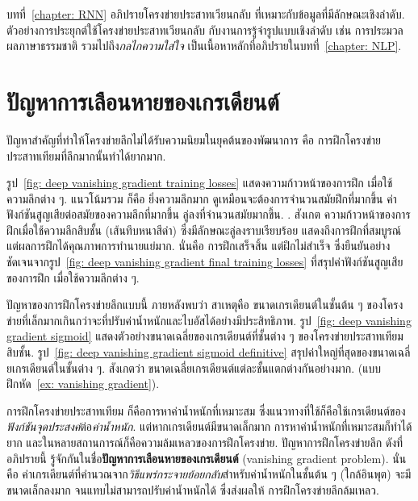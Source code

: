 บทที่~\ref{chapter: RNN} อภิปรายโครงข่ายประสาทเวียนกลับ
ที่เหมาะกับข้อมูลที่มีลักษณะเชิงลำดับ.
ตัวอย่างการประยุกต์ใช้โครงข่ายประสาทเวียนกลับ
กับงานการรู้จำรูปแบบเชิงลำดับ
เช่น การประมวลผลภาษาธรรมชาติ
รวมไปถึง\textit{กลไกความใส่ใจ}
เป็นเนื้อหาหลักที่อภิปรายในบทที่~\ref{chapter: NLP}.

\section{ปัญหาการเลือนหายของเกรเดียนต์}
\label{sec: relu}

ปัญหาสำคัญที่ทำให้โครงข่ายลึกไม่ได้รับความนิยมในยุคต้นของพัฒนาการ
คือ
%
การฝึกโครงข่ายประสาทเทียมที่ลึกมากนั้นทำได้ยากมาก.

รูป~\ref{fig: deep vanishing gradient training losses}
แสดงความก้าวหน้าของการฝึก เมื่อใช้ความลึกต่าง ๆ.
แนวโน้มรวม ก็คือ ยิ่งความลึกมาก ดูเหมือนจะต้องการจำนวนสมัยฝึกที่มากขึ้น
ค่าฟังก์ชันสูญเสียต่อสมัยของความลึกที่มากขึ้น ลู่ลงที่จำนวนสมัยมากขึ้น.
.
สังเกต ความก้าวหน้าของการฝึกเมื่อใช้ความลึกสิบชั้น (เส้นทึบหนาสีดำ) ซึ่งมีลักษณะลู่ลงราบเรียบร้อย แสดงถึงการฝึกที่สมบูรณ์
แต่ผลการฝึกได้คุณภาพการทำนายแย่มาก.
นั่นคือ การฝึกเสร็จสิ้น แต่ฝึกไม่สำเร็จ 
ซึ่งยืนยันอย่างชัดเจนจากรูป~\ref{fig: deep vanishing gradient final training losses}
ที่สรุปค่าฟังก์ชันสูญเสียของการฝึก เมื่อใช้ความลึกต่าง ๆ.

ปัญหาของการฝึกโครงข่ายลึกแบบนี้ ภายหลังพบว่า
สาเหตุคือ ขนาดเกรเดียนต์ในชั้นต้น ๆ ของโครงข่ายที่เล็กมากเกินกว่าจะที่ปรับค่าน้ำหนักและไบอัสได้อย่างมีประสิทธิภาพ.
รูป~\ref{fig: deep vanishing gradient sigmoid} แสดงตัวอย่างขนาดเฉลี่ยของเกรเดียนต์ที่ชั้นต่าง ๆ
ของโครงข่ายประสาทเทียมสิบชั้น.
รูป~\ref{fig: deep vanishing gradient sigmoid definitive} สรุปค่าใหญ่ที่สุดของขนาดเฉลี่ยเกรเดียนต์ในชั้นต่าง ๆ.
สังเกตว่า ขนาดเฉลี่ยเกรเดียนต์แต่ละชั้นแตกต่างกันอย่างมาก.
(แบบฝึกหัด~\ref{ex: vanishing gradient}).

การฝึกโครงข่ายประสาทเทียม ก็คือการหาค่าน้ำหนักที่เหมาะสม 
ซึ่งแนวทางที่ใช้ก็คือใช้เกรเดียนต์ของ\textit{ฟังก์ชันจุดประสงค์}ต่อ\textit{ค่าน้ำหนัก}.
แต่หากเกรเดียนต์มีขนาดเล็กมาก การหาค่าน้ำหนักที่เหมาะสมก็ทำได้ยาก และในหลายสถานการณ์ก็คือความล้มเหลวของการฝึกโครงข่าย.
ปัญหาการฝึกโครงข่ายลึก ดังที่อภิปรายนี้ รู้จักกันในชื่อ\textbf{ปัญหาการเลือนหายของเกรเดียนต์} (vanishing gradient problem). 
 
นั่นคือ ค่าเกรเดียนต์ที่คำนวณจาก\textit{วิธีแพร่กระจายย้อยกลับ}สำหรับค่าน้ำหนักในชั้นต้น ๆ (ใกล้อินพุต) จะมีขนาดเล็กลงมาก จนแทบไม่สามารถปรับค่าน้ำหนักได้
ซึ่งส่งผลให้ การฝึกโครงข่ายลึกล้มเหลว.

